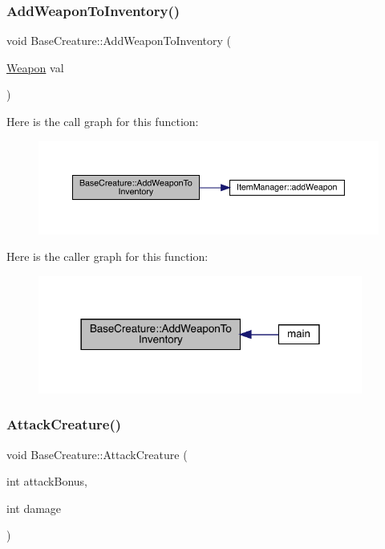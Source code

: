 \subsubsection{\texorpdfstring{Add\+Weapon\+To\+Inventory()}{AddWeaponToInventory()}}
{\footnotesize\ttfamily void Base\+Creature\+::\+Add\+Weapon\+To\+Inventory (\begin{DoxyParamCaption}\item[{\mbox{\hyperlink{class_weapon}{Weapon}}}]{val }\end{DoxyParamCaption})}

Here is the call graph for this function\+:
\nopagebreak
\begin{figure}[H]
\begin{center}
\leavevmode
\includegraphics[width=350pt]{d2/d3b/class_base_creature_ab0a90200835bc80c6db29e31f98d35e9_cgraph}
\end{center}
\end{figure}
Here is the caller graph for this function\+:
\nopagebreak
\begin{figure}[H]
\begin{center}
\leavevmode
\includegraphics[width=302pt]{d2/d3b/class_base_creature_ab0a90200835bc80c6db29e31f98d35e9_icgraph}
\end{center}
\end{figure}
\mbox{\label{class_base_creature_a63f43a7153eee3c1032b02f6d1948cdb}} 
\subsubsection{\texorpdfstring{Attack\+Creature()}{AttackCreature()}}
{\footnotesize\ttfamily void Base\+Creature\+::\+Attack\+Creature (\begin{DoxyParamCaption}\item[{int}]{attack\+Bonus,  }\item[{int}]{damage }\end{DoxyParamCaption})}

